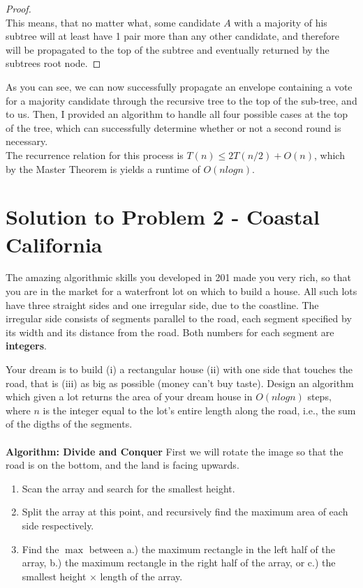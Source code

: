 \documentclass[11pt]{article}
\begin{document}
\begin{proof}
\\
This means, that no matter what, some candidate $A$ with a majority of his subtree will at least have 1 pair more than any other candidate, and therefore will be propagated to the top of the subtree and eventually returned by the subtrees root node.
\end{proof}

As you can see, we can now successfully propagate an envelope containing a vote for a majority candidate through the recursive tree to the top of the sub-tree, and to us. Then, I provided an algorithm to handle all four possible cases at the top of the tree, which can successfully determine whether or not a second round is necessary.\\
\linebreak
The recurrence relation for this process is $T(n) \leq 2T(n/2) + O(n)$, which by the Master Theorem is yields a runtime of $O(nlogn)$.

\newpage

\section*{Solution to Problem 2 - Coastal California}

The amazing algorithmic skills you developed in 201 made you very rich, so that you are in the market for a waterfront lot on which to build a house. All such lots have three straight sides and one irregular side, due to the coastline. The irregular side consists of segments parallel to the road, each segment specified by its width and its distance from the road. Both numbers for each segment are \textbf{integers}.

Your dream is to build (i) a rectangular house (ii) with one side that touches the road, that is (iii) as big as possible (money can't buy taste). Design an algorithm which given a lot returns the area of your dream house in $O(n log n)$ steps, where $n$ is the integer equal to the lot's entire length along the road, i.e., the sum of the digths of the segments.\\
\\
\textbf{Algorithm: Divide and Conquer}
First we will rotate the image so that the road is on the bottom, and the land is facing upwards.
\begin{enumerate}
\item Scan the array and search for the smallest height.
\item Split the array at this point, and recursively find the maximum area of each side respectively.
\item Find the $\max$ between a.) the maximum rectangle in the left half of the array, b.) the maximum rectangle in the right half of the array, or c.) the smallest height $\times$ length of the array.
\end{enumerate}
\end{document}
